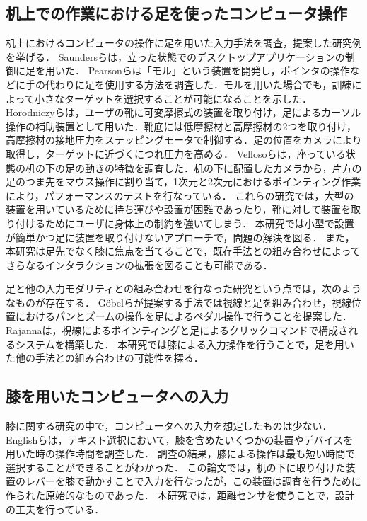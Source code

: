 \documentclass[submit, techrep]{ipsj}
\begin{document}
\subsection{机上での作業における足を使ったコンピュータ操作}
机上におけるコンピュータの操作に足を用いた入力手法を調査，提案した研究例を挙げる．
Saundersら\cite{Saunders:2016:TFI:2901790.2901815}は，立った状態でのデスクトップアプリケーションの制御に足を用いた．
Pearsonら\cite{Pearson:1986:MMD:22627.22392, Pearson:1988:EEP:57167.57169}は「モル」という装置を開発し，ポインタの操作などに手の代わりに足を使用する方法を調査した．モルを用いた場合でも，訓練によって小さなターゲットを選択することが可能になることを示した．
Horodniczyら\cite{Horodniczy:2017:FHE:3025453.3025625}は，ユーザの靴に可変摩擦式の装置を取り付け，足によるカーソル操作の補助装置として用いた．靴底には低摩擦材と高摩擦材の2つを取り付け，高摩擦材の接地圧力をステッピングモータで制御する．足の位置をカメラにより取得し，ターゲットに近づくにつれ圧力を高める．
Vellosoら\cite{velloso:hal-01599657}は，座っている状態の机の下の足の動きの特徴を調査した．机の下に配置したカメラから，片方の足のつま先をマウス操作に割り当て，1次元と2次元におけるポインティング作業により，パフォーマンスのテストを行なっている．
これらの研究では，大型の装置を用いているために持ち運びや設置が困難であったり，靴に対して装置を取り付けるためにユーザに身体上の制約を強いてしまう．
本研究では小型で設置が簡単かつ足に装置を取り付けないアプローチで，問題の解決を図る．
また，本研究は足先でなく膝に焦点を当てることで，既存手法との組み合わせによってさらなるインタラクションの拡張を図ることも可能である．\par
足と他の入力モダリティとの組み合わせを行なった研究という点では，次のようなものが存在する．
G\"{o}belら\cite{Gobel:2013:GFI:2468356.2479610}が提案する手法では視線と足を組み合わせ，視線位置におけるパンとズームの操作を足によるペダル操作で行うことを提案した．
Rajanna\cite{Rajanna:2016:GFI:2876456.2876462}は，視線によるポインティングと足によるクリックコマンドで構成されるシステムを構築した．
本研究では膝による入力操作を行うことで，足を用いた他の手法との組み合わせの可能性を探る．

\subsection{膝を用いたコンピュータへの入力}
膝に関する研究の中で，コンピュータへの入力を想定したものは少ない．
Englishら\cite{1698228}は，テキスト選択において，膝を含めたいくつかの装置やデバイスを用いた時の操作時間を調査した．
調査の結果，膝による操作は最も短い時間で選択することができることがわかった．
この論文では，机の下に取り付けた装置のレバーを膝で動かすことで入力を行なったが，この装置は調査を行うために作られた原始的なものであった．
本研究では，距離センサを使うことで，設計の工夫を行っている．
\end{document}
